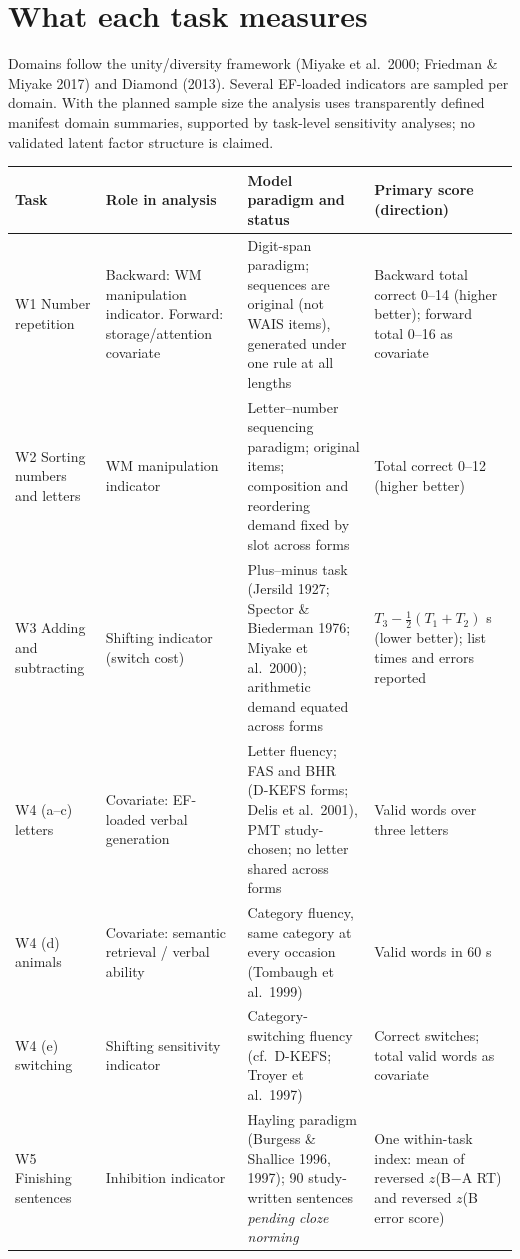\documentclass[11pt,a4paper]{article}
\begin{document}
\section{What each task measures}
Domains follow the unity/diversity framework (Miyake et al.\ 2000; Friedman \& Miyake 2017) and Diamond (2013). Several EF-loaded indicators are sampled per domain. With the planned sample size the analysis uses transparently defined manifest domain summaries, supported by task-level sensitivity analyses; no validated latent factor structure is claimed.

\begin{longtable}{@{}p{2.3cm}p{3.0cm}p{5.0cm}p{4.6cm}@{}}
\toprule
Task & Role in analysis & Model paradigm and status & Primary score (direction) \\ \midrule
W1 Number repetition & Backward: WM manipulation indicator. Forward: storage/attention covariate & Digit-span paradigm; sequences are original (not WAIS items), generated under one rule at all lengths & Backward total correct 0--14 (higher better); forward total 0--16 as covariate \\
W2 Sorting numbers and letters & WM manipulation indicator & Letter--number sequencing paradigm; original items; composition and reordering demand fixed by slot across forms & Total correct 0--12 (higher better) \\
W3 Adding and subtracting & Shifting indicator (switch cost) & Plus--minus task (Jersild 1927; Spector \& Biederman 1976; Miyake et al.\ 2000); arithmetic demand equated across forms & $T_3-\tfrac12(T_1+T_2)$ s (lower better); list times and errors reported \\
W4 (a--c) letters & Covariate: EF-loaded verbal generation & Letter fluency; FAS and BHR (D-KEFS forms; Delis et al.\ 2001), PMT study-chosen; no letter shared across forms & Valid words over three letters \\
W4 (d) animals & Covariate: semantic retrieval / verbal ability & Category fluency, same category at every occasion (Tombaugh et al.\ 1999) & Valid words in 60 s \\
W4 (e) switching & Shifting sensitivity indicator & Category-switching fluency (cf.\ D-KEFS; Troyer et al.\ 1997) & Correct switches; total valid words as covariate \\
W5 Finishing sentences & Inhibition indicator & Hayling paradigm (Burgess \& Shallice 1996, 1997); 90 study-written sentences \emph{pending cloze norming} & One within-task index: mean of reversed $z$(B$-$A RT) and reversed $z$(B error score) \\

\end{longtable}
\end{document}
